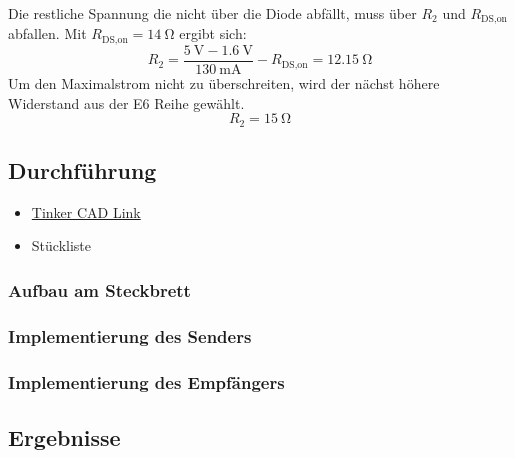 Die restliche Spannung die nicht über die Diode abfällt, muss über $R_2$ und $R_\text{DS,on}$ abfallen. Mit $R_{\text{DS,on}}=\SI{14}{\ohm}$ ergibt sich:
\[
R_2 = \frac{\SI{5}{\volt} - \SI{1.6}{\volt}}{\SI{130}{\milli\ampere}} - R_\text{DS,on} = \SI{12.15}{\ohm}
\]
Um den Maximalstrom nicht zu überschreiten, wird der nächst höhere Widerstand aus der E6 Reihe gewählt.
\[
R_2 = \SI{15}{\ohm}
\]

\subsection{Durchführung}


\begin{itemize}
    \item \href{https://www.tinkercad.com/things/0UY9zs3iKwE-dst-07-ir?sharecode=mE1HyXRFxTP7FBArqWQ20zcDbVb7zpU4BAKAofIcNlk}{Tinker CAD Link}
    \item Stückliste
\end{itemize}


\subsubsection{Aufbau am Steckbrett}

\subsubsection{Implementierung des Senders}

\subsubsection{Implementierung des Empfängers}

\subsection{Ergebnisse}